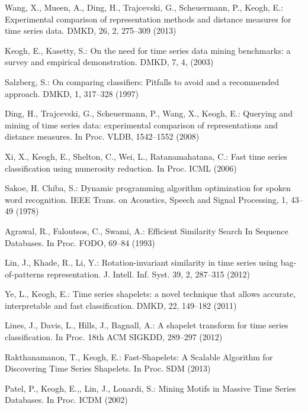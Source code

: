 \documentclass[conference]{IEEEtran}
\begin{document}
\enlargethispage{0.5cm}

\begin{thebibliography}{4}

Wang, X., Mueen, A., Ding, H., Trajcevski, G., Scheuermann, P., Keogh, E.:
Experimental comparison of representation methods and distance measures for time series data.
DMKD, 26, 2, 275--309 (2013)

Keogh, E., Kasetty, S.:
On the need for time series data mining benchmarks: a survey and empirical demonstration.
DMKD, 7, 4, (2003)

Salzberg, S.:
On comparing classifiers: Pitfalls to avoid and a recommended approach. 
DMKD, 1, 317--328 (1997)

Ding, H., Trajcevski, G., Scheuermann, P., Wang, X., Keogh, E.:
Querying and mining of time series data: experimental comparison of representations and distance
measures. 
In Proc. VLDB, 1542--1552 (2008)

Xi, X., Keogh, E., Shelton, C., Wei, L., Ratanamahatana, C.:
Fast time series classification using numerosity reduction. 
In Proc. ICML (2006)

Sakoe, H. Chiba, S.:
Dynamic programming algorithm optimization for spoken word recognition.
IEEE Trans. on Acoustics, Speech and Signal Processing, 1, 43--49 (1978)

Agrawal, R., Faloutsos, C., Swami, A.:
Efficient Similarity Search In Sequence Databases.
In Proc. FODO, 69--84 (1993)

Lin, J., Khade, R., Li, Y.:
Rotation-invariant similarity in time series using bag-of-patterns representation. 
J. Intell. Inf. Syst. 39, 2, 287--315 (2012)

Ye, L., Keogh, E.:
Time series shapelets: a novel technique that allows accurate, interpretable and fast
classification. 
DMKD, 22, 149--182 (2011)

Lines, J., Davis, L., Hills, J., Bagnall, A.:
A shapelet transform for time series classification. 
In Proc. 18th ACM SIGKDD, 289--297 (2012)

Rakthanamanon, T., Keogh, E.:
Fast-Shapelets: A Scalable Algorithm for Discovering Time Series Shapelets.
In Proc. SDM (2013)

Patel, P., Keogh, E.,, Lin, J., Lonardi, S.:
Mining Motifs in Massive Time Series Databases. 
In Proc. ICDM (2002)


\end{thebibliography}
\end{document}
